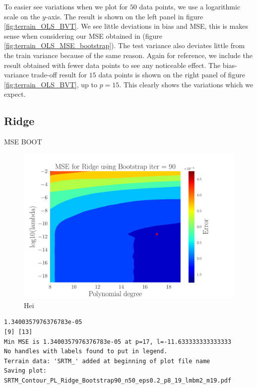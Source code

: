 \documentclass[reprint,english,notitlepage,aps,nobalancelastpage,nofootinbib]{revtex4-1}  %
\begin{document}
To easier see variations when we plot for $50$ data points, we use a logarithmic scale on the $y$-axis. The result is shown on the left panel in figure \ref{fig:terrain_OLS_BVT}. We see little deviations in bias and MSE, this is makes sense when considering our MSE obtained in (figure \ref{fig:terrain_OLS_MSE_bootstrap}). The test variance also deviates little from the train variance because of the same reason. Again for reference, we include the result obtained with fewer data points to see any noticeable effect. The bias-variance trade-off result for $15$ data points is shown on the right panel of figure \ref{fig:terrain_OLS_BVT}, up to $p=15$. This clearly shows the variations which we expect.

\subsection*{Ridge}
MSE BOOT
\begin{figure}[H]
	\includegraphics[width=\linewidth]{SRTM_Contour_PL_Ridge_Bootstrap90_n50_eps0.2_p8_19_lmbm2_m19.pdf}
	\caption{Hei}
	\label{fig:terrain_Ridge_MSE_Boot}
\end{figure}
\begin{verbatim}
1.3400357976376783e-05
[9] [13]
Min MSE is 1.3400357976376783e-05 at p=17, l=-11.633333333333333
No handles with labels found to put in legend.
Terrain data: 'SRTM_' added at beginning of plot file name
Saving plot:  SRTM_Contour_PL_Ridge_Bootstrap90_n50_eps0.2_p8_19_lmbm2_m19.pdf
\end{verbatim}
\end{document}
